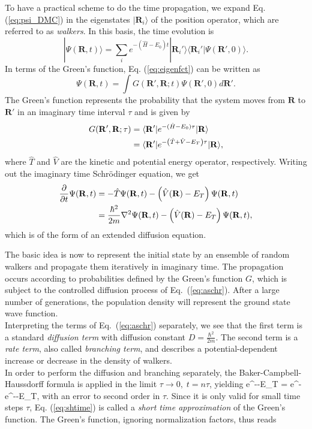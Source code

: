 To have a practical scheme  to do the time propagation, we expand Eq. (\ref{eq:psi_DMC}) in the eigenstates $|\mathbf{R}_i\rangle$ of the position operator, which are referred to as \textit{walkers}. In this basis, the time evolution is
\begin{equation}
|\Psi(\mathbf{R},t)\rangle = \sum\limits_i e^{-(\hat{H}-E_0)t}|\mathbf{R}_i'\rangle\langle \mathbf{R}_i'|\Psi(\mathbf{R}',0)\rangle.
\label{eq:eigenfct}
\end{equation}
In terms of the Green's function, Eq. (\ref{eq:eigenfct}) can be written as
\[
\Psi(\mathbf{R},t) = \int G(\mathbf{R}',\mathbf{R};t)\Psi(\mathbf{R}',0)d\mathbf{R}'.
\]
The Green's function represents the probability that the system moves from $\mathbf{R}$ to $\mathbf{R}'$ in an imaginary time interval $\tau$ and is given by
\begin{align}
G(\mathbf{R}',\mathbf{R};\tau) &= \langle  \mathbf{R}'| e^{-(\hat{H}-E_0)\tau} | \mathbf{R}\rangle\\
& = 
 \langle  \mathbf{R}'| e^{-\left( \hat{T} + \hat{V}-E_T\right) \tau} | \mathbf{R}\rangle,
\end{align}
where $\hat{T}$ and $\hat{V}$ are the kinetic and potential energy operator, respectively. 
Writing out the imaginary time Schr\"odinger equation, we get
\begin{align}
\frac{\partial}{\partial t} \Psi(\mathbf{R},t) &= 
-\hat{T}\Psi(\mathbf{R},t) - \lb \hat{V}(\mathbf{R}) - E_T \rb \Psi(\mathbf{R},t) \notag \\
&= \frac{\hbar^2}{2m}\nabla^2\Psi(\mathbf{R},t) - \lb \hat{V}(\mathbf{R}) - E_T \rb \Psi(\mathbf{R},t), \notag \\ 
\label{eq:aschr}
\end{align}
which is of the form of an extended diffusion equation. 

The basic idea is now to represent the initial state by
an  ensemble of random walkers 
and propagate them iteratively in imaginary time. The propagation occurs  according to probabilities defined by the Green's function $G$, which is subject to the controlled diffusion process of Eq.~(\ref{eq:aschr}). After a large number of generations, the population density will represent the ground state wave function. \\
Interpreting the terms of Eq.~(\ref{eq:aschr}) separately, we see that the first term is a standard \textit{diffusion term} with diffusion constant
$D = \frac{\hbar^2}{2m}$.
The second term is a \textit{rate term}, also called \textit{branching term}, and describes a potential-dependent increase or decrease in the density of walkers. \\
In order to perform the diffusion and branching separately, the Baker-Campbell-Haussdorff formula \cite{shavitt2009many} is applied in the limit $\tau \rightarrow 0,\; t = n\tau  $, yielding
\be 
e^{-\lb{}-E_T\rb \tau} =  e^{-\tau} e^{-\lb {}-E_T\rb\tau},
\label{eq:shtime}
\ee
with an error to second order in $\tau$.  Since it is only valid for small time steps $\tau$, Eq. (\ref{eq:shtime}) is called a \textit{short time approximation} of the Green's function.
The Green's function, ignoring normalization factors, thus reads \cite{hammond1994monte}

